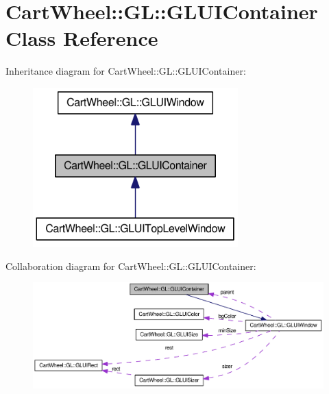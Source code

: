 \hypertarget{classCartWheel_1_1GL_1_1GLUIContainer}{
\section{CartWheel::GL::GLUIContainer Class Reference}
\label{classCartWheel_1_1GL_1_1GLUIContainer}
}


Inheritance diagram for CartWheel::GL::GLUIContainer:\nopagebreak
\begin{figure}[H]
\begin{center}
\leavevmode
\includegraphics[width=224pt]{classCartWheel_1_1GL_1_1GLUIContainer__inherit__graph}
\end{center}
\end{figure}


Collaboration diagram for CartWheel::GL::GLUIContainer:\nopagebreak
\begin{figure}[H]
\begin{center}
\leavevmode
\includegraphics[width=400pt]{classCartWheel_1_1GL_1_1GLUIContainer__coll__graph}
\end{center}
\end{figure}

